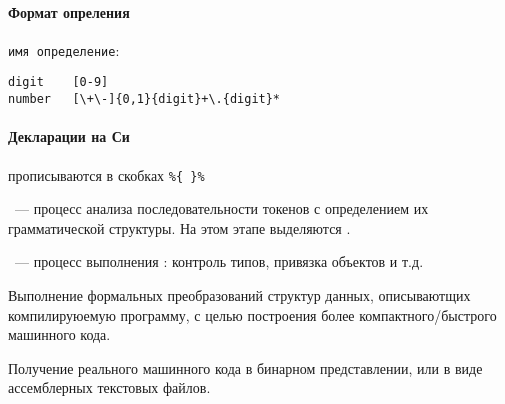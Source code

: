 \paragraph{Формат опреления} \verb|имя определение|:
\begin{verbatim}
digit    [0-9]
number   [\+\-]{0,1}{digit}+\.{digit}*
\end{verbatim}

\paragraph{Декларации на Си} прописываются в скобках \verb|%{ }%|







\begin{framed}\noindent
{}\ --- процесс анализа
последовательности токенов с определением их грамматической структуры. На этом
этапе выделяются .
\end{framed}


\begin{framed}\noindent
{}\ --- процесс выполнения
: контроль типов, привязка объектов и т.д. 
\end{framed}


Выполнение формальных преобразований структур данных, описываютщих
компилируюемую программу, с целью построения более компактного/быстрого
машинного кода.


Получение реального машинного кода в бинарном представлении, или в виде
ассемблерных текстовых файлов.



\secup
